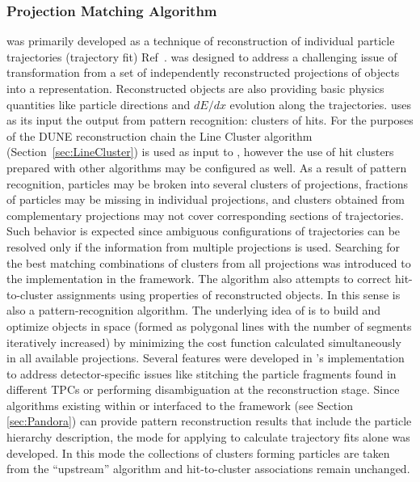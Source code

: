 \subsubsection{Projection Matching Algorithm}\label{sec:PMA}
  was primarily developed as a technique of \threed reconstruction of individual particle trajectories (trajectory fit) Ref~\cite{Antonello:2012hu}.  was designed to address a challenging issue of transformation from a set of independently reconstructed \twod projections of objects into a \threed representation. Reconstructed \threed objects are also providing  basic physics quantities like particle directions and $dE/dx$ evolution along the trajectories.  uses as its input the output from \twod pattern recognition: clusters of hits. For the purposes of the DUNE reconstruction chain the Line Cluster algorithm (Section~\ref{sec:LineCluster}) is used as input to , however the use of hit clusters prepared with other algorithms may be configured as well. As a result of \twod pattern recognition, particles may be broken into several clusters of \twod projections, fractions of particles may be missing in individual projections, and clusters obtained from complementary projections %
may not cover corresponding sections of trajectories. Such behavior is expected since ambiguous configurations of trajectories can be resolved only if the information from multiple \twod projections is used. Searching for the best matching combinations of clusters from all \twod projections was introduced to the  implementation in the  framework. The algorithm also attempts to correct hit-to-cluster assignments using properties of \threed reconstructed objects. In this sense  is also a pattern-recognition algorithm.
The underlying idea of  is to build and optimize objects in \threed space (formed as polygonal lines with %
the number of segments iteratively increased) by minimizing the cost function calculated simultaneously in all available \twod projections. 
Several features were developed in 's  implementation to address detector-specific issues like stitching the particle fragments found in different TPCs or %
performing disambiguation at the \threed reconstruction stage. Since algorithms existing within or interfaced to the  framework (see Section \ref{sec:Pandora}) can provide pattern reconstruction results that include the particle hierarchy description, the mode for applying  to calculate %
trajectory fits alone was developed. In this mode the collections of clusters forming particles are taken from the ``upstream'' algorithm and  hit-to-cluster associations remain unchanged. %




